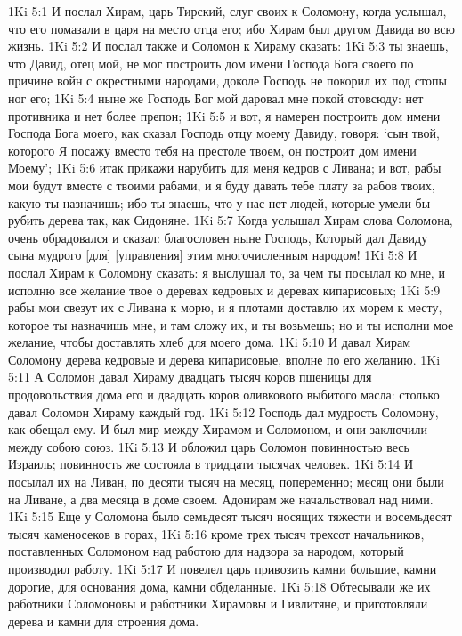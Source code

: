 1Ki 5:1  И послал Хирам, царь Тирский, слуг своих к Соломону, когда услышал, что его помазали в царя на место отца его; ибо Хирам был другом Давида во всю жизнь.
1Ki 5:2  И послал также и Соломон к Хираму сказать:
1Ki 5:3  ты знаешь, что Давид, отец мой, не мог построить дом имени Господа Бога своего по причине войн с окрестными народами, доколе Господь не покорил их под стопы ног его;
1Ki 5:4  ныне же Господь Бог мой даровал мне покой отовсюду: нет противника и нет более препон;
1Ki 5:5  и вот, я намерен построить дом имени Господа Бога моего, как сказал Господь отцу моему Давиду, говоря: `сын твой, которого Я посажу вместо тебя на престоле твоем, он построит дом имени Моему';
1Ki 5:6  итак прикажи нарубить для меня кедров с Ливана; и вот, рабы мои будут вместе с твоими рабами, и я буду давать тебе плату за рабов твоих, какую ты назначишь; ибо ты знаешь, что у нас нет людей, которые умели бы рубить дерева так, как Сидоняне.
1Ki 5:7  Когда услышал Хирам слова Соломона, очень обрадовался и сказал: благословен ныне Господь, Который дал Давиду сына мудрого [для] [управления] этим многочисленным народом!
1Ki 5:8  И послал Хирам к Соломону сказать: я выслушал то, за чем ты посылал ко мне, и исполню все желание твое о деревах кедровых и деревах кипарисовых;
1Ki 5:9  рабы мои свезут их с Ливана к морю, и я плотами доставлю их морем к месту, которое ты назначишь мне, и там сложу их, и ты возьмешь; но и ты исполни мое желание, чтобы доставлять хлеб для моего дома.
1Ki 5:10  И давал Хирам Соломону дерева кедровые и дерева кипарисовые, вполне по его желанию.
1Ki 5:11  А Соломон давал Хираму двадцать тысяч коров пшеницы для продовольствия дома его и двадцать коров оливкового выбитого масла: столько давал Соломон Хираму каждый год.
1Ki 5:12  Господь дал мудрость Соломону, как обещал ему. И был мир между Хирамом и Соломоном, и они заключили между собою союз.
1Ki 5:13  И обложил царь Соломон повинностью весь Израиль; повинность же состояла в тридцати тысячах человек.
1Ki 5:14  И посылал их на Ливан, по десяти тысяч на месяц, попеременно; месяц они были на Ливане, а два месяца в доме своем. Адонирам же начальствовал над ними.
1Ki 5:15  Еще у Соломона было семьдесят тысяч носящих тяжести и восемьдесят тысяч каменосеков в горах,
1Ki 5:16  кроме трех тысяч трехсот начальников, поставленных Соломоном над работою для надзора за народом, который производил работу.
1Ki 5:17  И повелел царь привозить камни большие, камни дорогие, для основания дома, камни обделанные.
1Ki 5:18  Обтесывали же их работники Соломоновы и работники Хирамовы и Гивлитяне, и приготовляли дерева и камни для строения дома.
